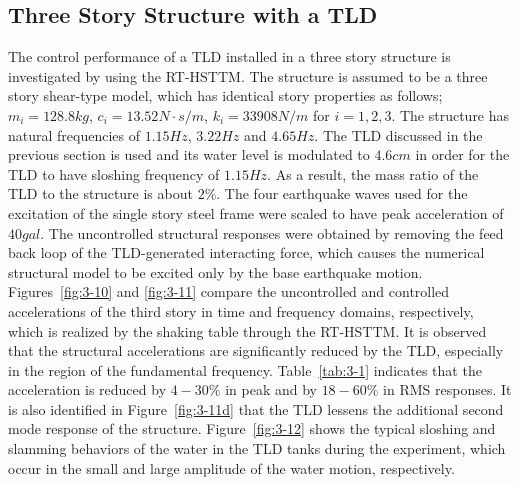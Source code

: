 \clearpage
\subsection{Three Story Structure with a TLD}
The control performance of a TLD installed in a three story structure is investigated by using the RT-HSTTM. The structure is assumed to be a three story shear-type model, which has identical story properties as follows; $m_{i}=128.8kg$, $c_{i}=13.52N\cdot s/m$, $k_{i}=33908N/m$ for $i=1,2,3$. The structure has natural frequencies of $1.15Hz$, $3.22Hz$ and $4.65Hz$. The TLD discussed in the previous section is used and its water level is modulated to $4.6cm$ in order for the TLD to have sloshing frequency of $1.15Hz$. As a result, the mass ratio of the TLD to the structure is about $2\%$. The four earthquake waves used for the excitation of the single story steel frame were scaled to have peak acceleration of $40gal$. The uncontrolled structural responses were obtained by removing the feed back loop of the TLD-generated interacting force, which causes the numerical structural model to be excited only by the base earthquake motion. 
Figures~\ref{fig:3-10} and \ref{fig:3-11} compare the uncontrolled and controlled accelerations of the third story in time and frequency domains, respectively, which is realized by the shaking table through the RT-HSTTM. It is observed that the structural accelerations are significantly reduced by the TLD, especially in the region of the fundamental frequency. Table~\ref{tab:3-1} indicates that the acceleration is reduced by $4-30\%$ in peak and by $18-60\%$ in RMS responses. It is also identified in Figure~\ref{fig:3-11d} that the TLD lessens the additional second mode response of the structure. Figure~\ref{fig:3-12} shows the typical sloshing and slamming behaviors of the water in the TLD tanks during the experiment, which occur in the small and large amplitude of the water motion, respectively\citep{yalla2001liquid}.

